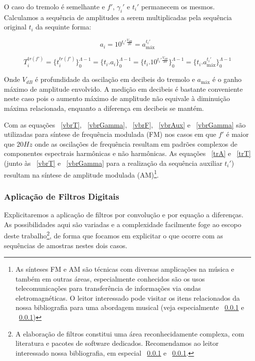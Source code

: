 O caso do tremolo é semelhante e $f'$, $\gamma_i'$ e $t_i'$ permanecem os mesmos. Calculamos
a sequência de amplitudes a serem multiplicadas pela sequência original $t_i$ da
sequinte forma:

\begin{equation}\label{trA}
a_i=10^{t_i' \frac{V_{dB}}{20}} = a_{\text{máx}}^{t_i'}
\end{equation}

\begin{equation}\label{trT}
T_i^{tr(f')}=\{ t_i^{tr(f')} \}_0^{\Lambda-1}=\{ t_i . a_i \}_0^{\Lambda-1}=\{t_i .10^{t_i' \frac{V_{dB}}{20}}    \}_0^{\Lambda-1}=\{t_i . a_{\text{máx}}^{t_i'}\}_0^{\Lambda-1}
\end{equation}

Onde $V_{dB}$ é profundidade da oscilação em decibeis do tremolo e $a_{\text{máx}}$ é o ganho máximo de amplitude envolvido.
A medição em decibeis é bastante conveniente neste caso pois o aumento máximo de amplitude
não equivale à diminuição máxima relacionada, enquanto a diferença em decibeis se mantém.

Com as equações ~\ref{vbrT}, ~\ref{vbrGamma}, ~\ref{vbrF}, ~\ref{vbrAux} e  ~\ref{vbrGamma}
são utilizadas para síntese de frequência modulada (FM) nos casos em que $f'$ é
maior que $20Hz$ onde as oscilações de frequência resultam em padrões complexos
de componentes espectrais harmônicas e não harmônicas. As equações ~\ref{trA}
e ~\ref{trT} (junto às ~\ref{vbrT} e ~\ref{vbrGamma} para a realização da sequência
auxiliar $t_i'$) resultam na síntese de amplitude modulada (AM)\footnote{As sínteses
FM e AM são técnicas com diversas amplicações na música e também em outras áreas,
especialmente conhecidos são os usos telecomunicações para transferência de informações
via ondas eletromagnéticas. O leitor interessado pode visitar os itens relacionados
da nossa bibliografia para uma abordagem musical (veja especialmente ~\ref{} e ~\ref{})}.

\subsubsection{Aplicação de Filtros Digitais}
Explicitaremos a aplicação de filtros por convolução
e por equação a diferenças. As possibilidades
aqui são variadas e a complexidade facilmente
foge ao escopo deste trabalho\footnote{A elaboração de filtros
constitui uma área reconhecidamente complexa, com literatura
e pacotes de software dedicados. 
Recomendamos ao leitor
interessado nossa bibliografia, em especial ~\ref{} e ~\ref{}.},
de forma que focamos em explicitar o que ocorre com as sequências
de amostras nestes dois casos.

